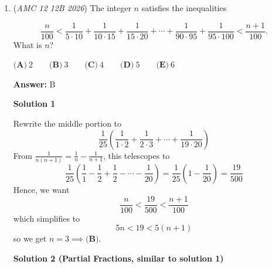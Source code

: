 \begin{enumerate}
 



\textbf{Solution 5 (More direct)}

We use the identities $\log_{x} y = \frac{1}{\log_{y} x}$, $\log_{x} y^z = z\log_{x} y$, and $\log_{x} y \cdot \log_{y} z = \log_{x} z$. Notice that $\frac{1}{c} = \log_{5} 32$, so
 \begin{align*} \frac{ab}{c} &= \log_{2} 27 \cdot \log_{3} 25 \cdot \log_{5} 32 \\              &= \left( 3\log_{2} 3 \right) \left( 2 \log_{3} 5\right) \left( 5 \log_{5} 2\right) \\              &= (3 \cdot 2 \cdot 5)(\log_2 3 \cdot \log_3 5 \cdot \log_5 2) \\              &= 30 \implies \boxed{\textbf{(C) } 30}, \\ \end{align*}
where we simplify $\log_2 3 \cdot \log_3 5 \cdot \log_5 2 = \log_2 5 \cdot \log_5 2 = \log_2 2 = 1$.

 


	\item (\textit{AMC 12 12B 2026}) The integer $n$ satisfies the inequalities

 \[\frac{n}{100} < \frac{1}{5 \cdot 10} + \frac{1}{10 \cdot 15} + \frac{1}{15 \cdot 20} + \cdots + \frac{1}{90\cdot 95} + \frac{1}{95\cdot 100} < \frac{n+1}{100}.\]
What is $n$?


 $\textbf{(A)}\   2  \qquad                 \textbf{(B)}\   3  \qquad                 \textbf{(C)}\   4  \qquad                 \textbf{(D)}\   5  \qquad                 \textbf{(E)}\   6$

 \textbf{Answer: }B



\textbf{Solution 1}

Rewrite the middle portion to
 \[\frac{1}{25}\left(\frac{1}{1\cdot 2}+\frac{1}{2\cdot 3}+\cdots +\frac{1}{19\cdot 20}\right)\]From $\frac{1}{n(n+1)}=\frac{1}{n}-\frac{1}{n+1}$, this telescopes to
 \[\frac{1}{25}\left(\frac{1}{1}-\frac{1}{2}+\frac{1}{2}-\cdots -\frac{1}{20}\right)=\frac{1}{25}\left(1-\frac{1}{20}\right)=\frac{19}{500}\]Hence, we want
 \[\frac{n}{100}<\frac{19}{500}<\frac{n+1}{100}\]which simplifies to
 \[5n<19<5(n+1)\]so we get $n=3\implies \boxed{\textbf{(B)}}$.

 



\textbf{Solution 2 (Partial Fractions, similar to solution 1)}


\end{enumerate}

